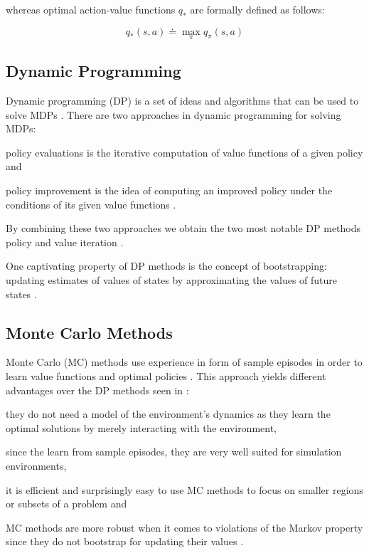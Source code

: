 \documentclass{seal_thesis}
\begin{document}
whereas optimal action-value functions $q_*$ are formally defined as follows:

\begin{equation}
	q_* (s,a) \doteq \max_\pi q_\pi (s,a)
\end{equation}

\subsection{Dynamic Programming}
\label{subsec:dp}

Dynamic programming (DP) is a set of ideas and algorithms that can be used to solve MDPs \cite[p. 95]{Sutton2017}. There are two approaches in dynamic programming for solving MDPs:
\begin{enumerate*}
	\item policy evaluations is the iterative computation of value functions of a given policy and
	\item policy improvement is the idea of computing an improved policy under the conditions of its given value functions \cite[p. 95]{Sutton2017}.
\end{enumerate*}

By combining these two approaches we obtain the two most notable DP methods \ie policy and value iteration \cite[p. 95]{Sutton2017}.

One captivating property of DP methods is the concept of bootstrapping: updating estimates of values of states by approximating the values of future states \cite[p. 96]{Sutton2017}.

\subsection{Monte Carlo Methods}
\label{subsec:mc}

Monte Carlo (MC) methods use experience in form of sample episodes in order to learn value functions and optimal policies \cite[p. 123]{Sutton2017}. This approach yields different advantages over the DP methods seen in :
\begin{enumerate*}
	\item they do not need a model of the environment's dynamics as they learn the optimal solutions by merely interacting with the environment,
	\item since the learn from sample episodes, they are very well suited for simulation environments,
	\item it is efficient and surprisingly easy to use MC methods to focus on smaller regions or subsets of a problem and
	\item MC methods are more robust when it comes to violations of the Markov property since they do not bootstrap for updating their values \cite[p. 123]{Sutton2017}.
\end{enumerate*}
\end{document}

